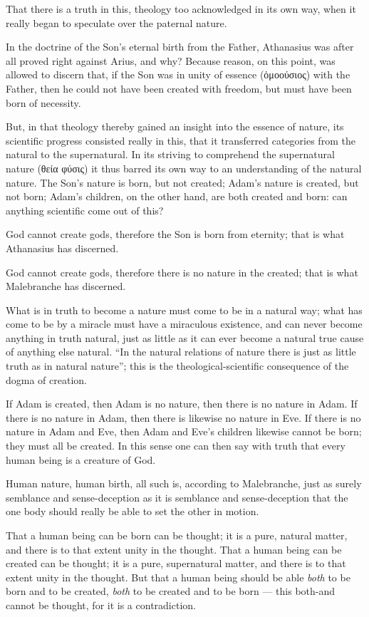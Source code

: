 \documentclass[12pt,a4paper]{article}
\begin{document}
That there is a truth in this, theology too acknowledged in its own way, when it
really began to speculate over the paternal nature.

In the doctrine of the Son's eternal birth from the Father, Athanasius was after
all proved right against Arius, and why? Because reason, on this point, was allowed
to discern that, if the Son was in unity of essence (ὁμοούσιος) with the Father,
then he could not have been created with freedom, but must have been born of
necessity.

But, in that theology thereby gained an insight into the essence of nature, its
scientific progress consisted really in this, that it transferred categories from
the natural to the supernatural. In its striving to comprehend the supernatural
nature (θεία φύσις) it thus barred its own way to an understanding of the natural
nature.
The Son's nature is born, but not created; Adam's nature is created, but not born;
Adam's children, on the other hand, are both created and born: can anything
scientific come out of this?

God cannot create gods, therefore the Son is born from eternity; that is what
Athanasius has discerned.

God cannot create gods, therefore there is no nature in the created; that is what
Malebranche has discerned.

What is in truth to become a nature must come to be in a natural way; what has come
to be by a miracle must have a miraculous existence, and can never become anything
in truth natural, just as little as it can ever become a natural true cause of
anything else natural. ``In the natural relations of nature there is just as little
truth as in natural nature''; this is the theological-scientific consequence of the
dogma of creation.

If Adam is created, then Adam is no nature, then there is no nature in Adam. If
there is no nature in Adam, then there is likewise no nature in Eve. If there is no
nature in Adam and Eve, then Adam and Eve's children likewise cannot be born; they
must all be created. In this sense one can then say with truth that every human
being is a creature of God.

Human nature, human birth, all such is, according to Malebranche, just as surely
semblance and sense-deception as it is semblance and sense-deception that the one
body should really be able to set the other in motion.

That a human being can be born can be thought; it is a pure, natural matter, and
there is to that extent unity in the thought. That a human being can be created can
be thought; it is a pure, supernatural matter, and there is to that extent unity in
the thought. But that a human being should be able \emph{both} to be born and to be
created, \emph{both} to be created and to be born --- this both-and cannot be
thought, for it is a contradiction.
\end{document}
